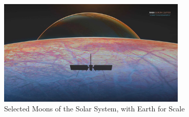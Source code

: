 \documentclass[]{article}
\begin{document}
\begin{figure}[H]
	\caption{Selected Moons of the Solar System, with Earth for Scale}\label{fig:icy:4}
	\includegraphics[width=0.8\textwidth]{icy4}
\end{figure}


\printglossaries

 


\end{document}
